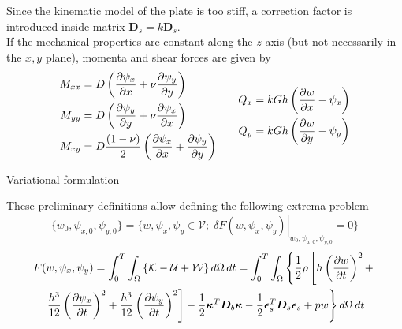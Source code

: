 \documentclass{beamer}
\begin{document}
\begin{frame}
Since the kinematic model of the plate is too stiff, a correction factor is introduced inside matrix $\overline{\bm{D}}_s = k \bm{D}_s$. \\
\vspace{5mm}
If the mechanical properties are constant along the $z$ axis (but not necessarily in the $x, y$ plane), momenta and shear forces are given by
\begin{equation*}
\begin{aligned}
M_{xx} & =D\left(\diffp{\psi_x}{x} + \nu \diffp{\psi_y}{y}\right)\\
M_{yy} & =D\left(\diffp{\psi_y}{y} + \nu \diffp{\psi_x}{x}\right)\\
M_{xy} & =D \frac{(1 - \nu)}{2} \left(\diffp{\psi_x}{x} + \diffp{\psi_y}{y}\right) \\
\end{aligned} \qquad
\begin{aligned}
Q_{x} & =k G h \left(\diffp{w}{x} - \psi_x \right) \\
Q_{y} & =k G h \left(\diffp{w}{y} - \psi_y \right) \\
\end{aligned}
\end{equation*}

\end{frame}


\begin{frame}{Variational formulation}

These preliminary definitions allow defining the following extrema problem
\begin{equation*} 
\{w_0, \psi_{x, 0}, \psi_{y, 0}\} = \{w, \psi_x, \psi_y \in \mathcal V; \; \left.\delta F(w,\psi_x, \psi_y) \right|_{w_0, \psi_{x, 0}, \psi_{y, 0}} = 0\} 
\end{equation*}
\begin{multline*}
F(w, \psi_x, \psi_y) = \int_0^T \int_\Omega \left\{\mathcal{K} - \mathcal{U} + \mathcal{W} \right\} d\Omega \, dt =  \int_0^T  \int_\Omega \left\{ \frac{1}{2} \rho \left[ h \left(\diffp{w}{t}\right)^2 + \right.  \right. \\
\left. \left. \frac{h^3}{12}\left(\diffp{\psi_x}{t}\right)^2 + \frac{h^3}{12}\left(\diffp{\psi_y}{t}\right)^2 \right]  - \frac{1}{2}\bm{\kappa}^T \bm{D}_b \bm{\kappa} - \frac{1}{2}\bm{\epsilon}_s^T \bm{D}_s \bm{\epsilon}_s + pw \right\}  d\Omega \, dt
\end{multline*}


\end{frame}
\end{document}
